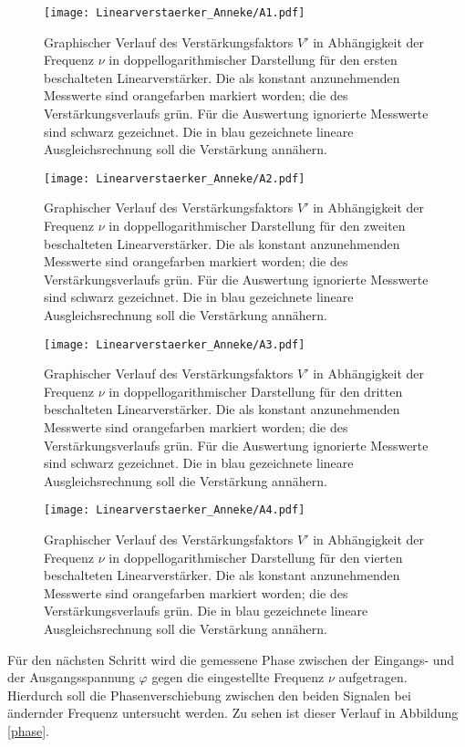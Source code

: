 \begin{figure}[h]
  \centering
  \texttt{[image: Linearverstaerker\_Anneke/A1.pdf]}
  \caption{Graphischer Verlauf des Verstärkungsfaktors $V'$ in Abhängigkeit der Frequenz $\nu$ in doppellogarithmischer Darstellung für den ersten beschalteten Linearverstärker. Die als konstant anzunehmenden Messwerte sind orangefarben markiert worden; die des Verstärkungsverlaufs grün. Für die Auswertung ignorierte Messwerte sind schwarz gezeichnet. Die in blau gezeichnete lineare Ausgleichsrechnung soll die Verstärkung annähern.}
  \label{linear1}
\end{figure}
\begin{figure}[h]
  \centering
  \texttt{[image: Linearverstaerker\_Anneke/A2.pdf]}
  \caption{Graphischer Verlauf des Verstärkungsfaktors $V'$ in Abhängigkeit der Frequenz $\nu$ in doppellogarithmischer Darstellung für den zweiten beschalteten Linearverstärker. Die als konstant anzunehmenden Messwerte sind orangefarben markiert worden; die des Verstärkungsverlaufs grün. Für die Auswertung ignorierte Messwerte sind schwarz gezeichnet.  Die in blau gezeichnete lineare Ausgleichsrechnung soll die Verstärkung annähern.}
  \label{linear2}
\end{figure}
\begin{figure}[h]
  \centering
  \texttt{[image: Linearverstaerker\_Anneke/A3.pdf]}
  \caption{Graphischer Verlauf des Verstärkungsfaktors $V'$ in Abhängigkeit der Frequenz $\nu$ in doppellogarithmischer Darstellung für den dritten beschalteten Linearverstärker. Die als konstant anzunehmenden Messwerte sind orangefarben markiert worden; die des Verstärkungsverlaufs grün. Für die Auswertung ignorierte Messwerte sind schwarz gezeichnet.  Die in blau gezeichnete lineare Ausgleichsrechnung soll die Verstärkung annähern.}
  \label{linear3}
\end{figure}
\begin{figure}[h]
  \centering
  \texttt{[image: Linearverstaerker\_Anneke/A4.pdf]}
  \caption{Graphischer Verlauf des Verstärkungsfaktors $V'$ in Abhängigkeit der Frequenz $\nu$ in doppellogarithmischer Darstellung für den vierten beschalteten Linearverstärker. Die als konstant anzunehmenden Messwerte sind orangefarben markiert worden; die des Verstärkungsverlaufs grün.  Die in blau gezeichnete lineare Ausgleichsrechnung soll die Verstärkung annähern.}
  \label{linear4}
\end{figure}
\clearpage
Für den nächsten Schritt wird die gemessene Phase zwischen der Eingangs- und der Ausgangsspannung $\varphi$ gegen die eingestellte Frequenz $\nu$ aufgetragen. Hierdurch soll die Phasenverschiebung zwischen den beiden Signalen bei ändernder Frequenz untersucht werden. Zu sehen ist dieser Verlauf in Abbildung \ref{phase}.
